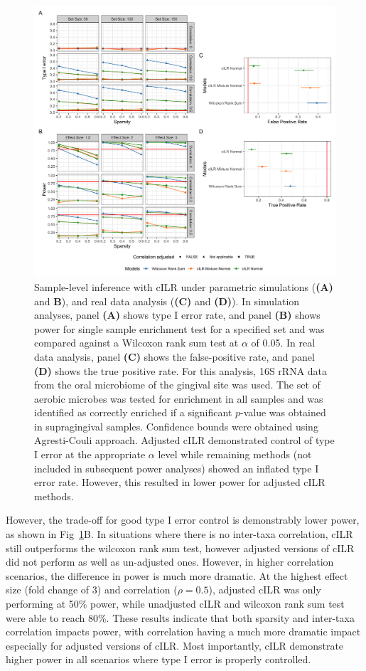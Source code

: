 \documentclass[10pt,letterpaper]{article}
\begin{document}
\begin{figure}[!h]
    \centering
    \includegraphics[width=\textwidth]{figures/sim_data_ss_hypo.png}
    \caption{Sample-level inference with cILR under parametric simulations (\textbf{(A)} and \textbf{B}), and real data analysis (\textbf{(C)} and \textbf{(D)}). In simulation analyses, panel \textbf{(A)} shows type I error rate, and panel \textbf{(B)} shows power for single sample enrichment test for a specified set and was compared against a Wilcoxon rank sum test at $\alpha$ of 0.05. In real data analysis, panel \textbf{(C)} shows the false-positive rate, and panel \textbf{(D)} shows the true positive rate. For this analysis, 16S rRNA data from the oral microbiome of the gingival site was used. The set of aerobic microbes was tested for enrichment in all samples and was identified as correctly enriched if a significant $p$-value was obtained in supragingival samples. Confidence bounds were obtained using Agresti-Couli \cite{agresti1998} approach. Adjusted cILR demonstrated control of type I error at the appropriate $\alpha$ level while remaining methods (not included in subsequent power analyses) showed an inflated type I error rate. However, this resulted in lower power for adjusted cILR methods.}
    \label{fig:2}
\end{figure}

However, the trade-off for good type I error control is demonstrably lower power, as shown in Fig~\ref{fig:2}B. In situations where there is no inter-taxa correlation, cILR still outperforms the wilcoxon rank sum test, however adjusted versions of cILR did not perform as well as un-adjusted ones. However, in higher correlation scenarios, the difference in power is much more dramatic. At the highest effect size (fold change of 3) and correlation ($\rho = 0.5$), adjusted cILR was only performing at 50\% power, while unadjusted cILR and wilcoxon rank sum test were able to reach 80\%. These results indicate that both sparsity and inter-taxa correlation impacts power, with correlation having a much more dramatic impact especially for adjusted versions of cILR. Most importantly, cILR demonstrate higher power in all scenarios where type I error is properly controlled.    
\end{document}

